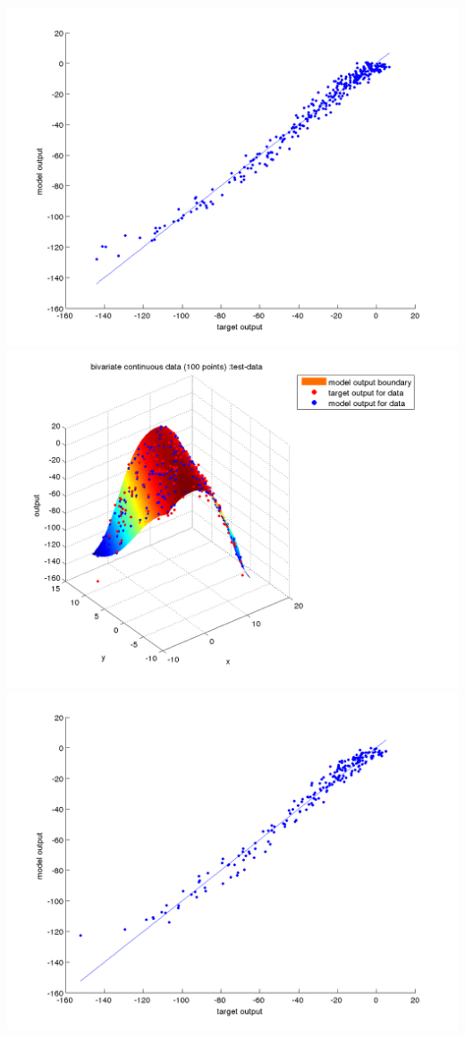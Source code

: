 \documentclass[fleqn]{article}
\begin{document}
\includegraphics[scale=0.4]{./pics/bivariate100/_2_4/_2_4_epoch_50_validation-data_scatter2d}
\includegraphics[scale=0.4]{./pics/bivariate100/_2_4/_2_4_epoch_50_test-data_scatter3d}
\includegraphics[scale=0.4]{./pics/bivariate100/_2_4/_2_4_epoch_50_test-data_scatter2d}
\end{document}
